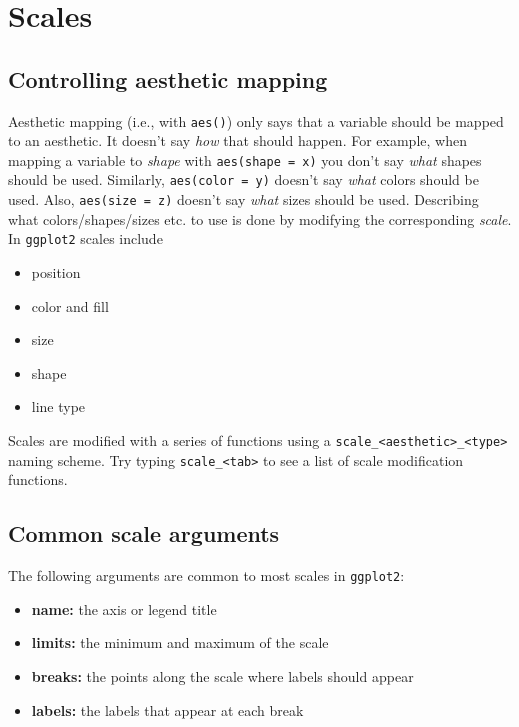 \documentclass[
]{book}
\providecommand{\tightlist}{%
  \setlength{\itemsep}{0pt}\setlength{\parskip}{0pt}}
\begin{document}
\hypertarget{scales}{%
\section{Scales}\label{scales}}

\hypertarget{controlling-aesthetic-mapping}{%
\subsection{Controlling aesthetic mapping}\label{controlling-aesthetic-mapping}}

Aesthetic mapping (i.e., with \texttt{aes()}) only says that a variable should be mapped to an aesthetic. It doesn't say \emph{how} that should happen. For example, when mapping a variable to \emph{shape} with \texttt{aes(shape\ =\ x)} you don't say \emph{what} shapes should be used. Similarly, \texttt{aes(color\ =\ y)} doesn't say \emph{what} colors should be used. Also, \texttt{aes(size\ =\ z)} doesn't say \emph{what} sizes should be used. Describing what colors/shapes/sizes etc. to use is done by modifying the corresponding \emph{scale}. In \texttt{ggplot2} scales include

\begin{itemize}
\tightlist
\item
  position
\item
  color and fill
\item
  size
\item
  shape
\item
  line type
\end{itemize}

Scales are modified with a series of functions using a \texttt{scale\_\textless{}aesthetic\textgreater{}\_\textless{}type\textgreater{}} naming scheme. Try typing \texttt{scale\_\textless{}tab\textgreater{}} to see a list of scale modification functions.

\hypertarget{common-scale-arguments}{%
\subsection{Common scale arguments}\label{common-scale-arguments}}

The following arguments are common to most scales in \texttt{ggplot2}:

\begin{itemize}
\tightlist
\item
  \textbf{name:} the axis or legend title
\item
  \textbf{limits:} the minimum and maximum of the scale
\item
  \textbf{breaks:} the points along the scale where labels should appear
\item
  \textbf{labels:} the labels that appear at each break
\end{itemize}
\end{document}
